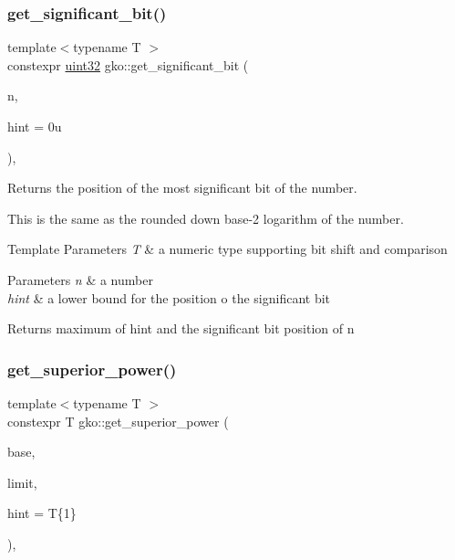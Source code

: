 \subsubsection{\texorpdfstring{get\+\_\+significant\+\_\+bit()}{get\_significant\_bit()}}
{\footnotesize\ttfamily template$<$typename T $>$ \\
constexpr \hyperlink{namespacegko_a318c831e3fe269ba04c6ed8bf5a71073}{uint32} gko\+::get\+\_\+significant\+\_\+bit (\begin{DoxyParamCaption}\item[{const T \&}]{n,  }\item[{\hyperlink{namespacegko_a318c831e3fe269ba04c6ed8bf5a71073}{uint32}}]{hint = {\ttfamily 0u} }\end{DoxyParamCaption})\hspace{0.3cm}{\ttfamily [inline]}, {\ttfamily [noexcept]}}



Returns the position of the most significant bit of the number. 

This is the same as the rounded down base-\/2 logarithm of the number.


\begin{DoxyTemplParams}{Template Parameters}
{\em T} & a numeric type supporting bit shift and comparison\\
\hline
\end{DoxyTemplParams}

\begin{DoxyParams}{Parameters}
{\em n} & a number \\
\hline
{\em hint} & a lower bound for the position o the significant bit\\
\hline
\end{DoxyParams}
\begin{DoxyReturn}{Returns}
maximum of {\ttfamily hint} and the significant bit position of {\ttfamily n} 
\end{DoxyReturn}
\mbox{\label{namespacegko_ad39645fe8148a8a812a9528865a77600}} 
\subsubsection{\texorpdfstring{get\+\_\+superior\+\_\+power()}{get\_superior\_power()}}
{\footnotesize\ttfamily template$<$typename T $>$ \\
constexpr T gko\+::get\+\_\+superior\+\_\+power (\begin{DoxyParamCaption}\item[{const T \&}]{base,  }\item[{const T \&}]{limit,  }\item[{const T \&}]{hint = {\ttfamily T\{1\}} }\end{DoxyParamCaption})\hspace{0.3cm}{\ttfamily [inline]}, {\ttfamily [noexcept]}}



